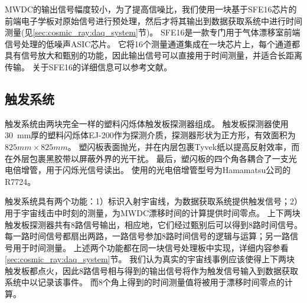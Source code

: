 MWDC的输出信号幅度较小，为了提高信噪比，我们使用一块基于SFE16芯片的前端电子学板对原始信号进行预处理，然后才将其输出到数据获取系统中进行时间测量(见\ref{sec:cosmic_ray:daq_system}节)。
SFE16是一款专门用于气体漂移室前端信号处理的低噪声ASIC芯片。
它将16个测量通道集成在一块芯片上，每个通道都具有信号放大和甄别的功能，因此输出信号可以直接用于时间测量，并适合长距离传输。
关于SFE16的详细信息可以参考文献\parencite{sfe16}。

\subsection{触发系统}
\label{sec:cosmic_ray:triggering_system}
触发系统由两块完全一样的塑料闪烁体触发板探测器组成。
触发板探测器使用\SI{30}{mm}厚的塑料闪烁体EJ-200\parencite{ej-200}作为探测介质，探测器形状为正方形，有效面积为$825mm \times 825mm$。
塑闪板表面抛光，并在内层包裹Tyvek纸以提高反射效率，而在外层包裹黑胶带以屏蔽外界的光干扰。
最后，塑闪板的四个角各耦合了一支光电倍增管，用于闪烁光信号读出。
使用的光电倍增管型号为Hamamatsu公司的R7724\parencite{r7724}。

触发系统具有两个功能：1）标识入射宇宙线，为数据获取系统提供触发信号；2）用于宇宙线击中时刻的测量，为MWDC漂移时间的计算提供时间零点。
上下两块触发板探测器共有8路信号输出，相应地，它们经过甄别后可以得到8路时间信号。
每一路时间信号都扇出两路，一路信号参加8路时间信号的逻辑与运算；另一路信号用于时间测量。
上述两个功能都在同一块信号处理板中实现，详细内容参看\ref{sec:cosmic_ray:daq_system}节。
我们认为真实的宇宙线事例应该使得上下两块触发板都点火，因此8路信号相与得到的输出信号将作为触发信号输入到数据获取系统中以记录该事件。
而8个角上得到的时间测量值将被用于漂移时间零点的计算。

